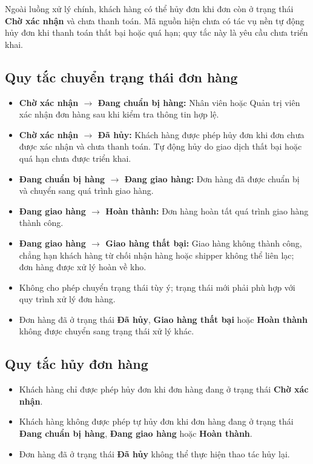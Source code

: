 Ngoài luồng xử lý chính, khách hàng có thể hủy đơn khi đơn còn ở trạng thái \textbf{Chờ xác nhận} và chưa thanh toán. Mã nguồn hiện chưa có tác vụ nền tự động hủy đơn khi thanh toán thất bại hoặc quá hạn; quy tắc này là yêu cầu chưa triển khai.

\subsection{Quy tắc chuyển trạng thái đơn hàng}

\begin{itemize}
\item \textbf{Chờ xác nhận $\rightarrow$ Đang chuẩn bị hàng:} Nhân viên hoặc Quản trị viên xác nhận đơn hàng sau khi kiểm tra thông tin hợp lệ.

\item \textbf{Chờ xác nhận $\rightarrow$ Đã hủy:} Khách hàng được phép hủy đơn khi đơn chưa được xác nhận và chưa thanh toán. Tự động hủy do giao dịch thất bại hoặc quá hạn chưa được triển khai.

\item \textbf{Đang chuẩn bị hàng $\rightarrow$ Đang giao hàng:} Đơn hàng đã được chuẩn bị và chuyển sang quá trình giao hàng.

\item \textbf{Đang giao hàng $\rightarrow$ Hoàn thành:} Đơn hàng hoàn tất quá trình giao hàng thành công.

\item \textbf{Đang giao hàng $\rightarrow$ Giao hàng thất bại:} Giao hàng không thành công, chẳng hạn khách hàng từ chối nhận hàng hoặc shipper không thể liên lạc; đơn hàng được xử lý hoàn về kho.

\item Không cho phép chuyển trạng thái tùy ý; trạng thái mới phải phù hợp với quy trình xử lý đơn hàng.

\item Đơn hàng đã ở trạng thái \textbf{Đã hủy}, \textbf{Giao hàng thất bại} hoặc \textbf{Hoàn thành} không được chuyển sang trạng thái xử lý khác.
\end{itemize}
\subsection{Quy tắc hủy đơn hàng}
\begin{itemize}
    \item Khách hàng chỉ được phép hủy đơn khi đơn hàng đang ở trạng thái \textbf{Chờ xác nhận}.
    \item Khách hàng không được phép tự hủy đơn khi đơn hàng đang ở trạng thái \textbf{Đang chuẩn bị hàng}, \textbf{Đang giao hàng} hoặc \textbf{Hoàn thành}.
    \item Đơn hàng đã ở trạng thái \textbf{Đã hủy} không thể thực hiện thao tác hủy lại.
\end{itemize}

